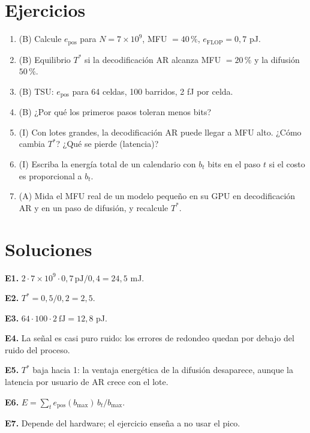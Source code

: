 \documentclass[11pt,a4paper]{article}
\begin{document}
\section{Ejercicios}
\begin{enumerate}[label=\textbf{E\arabic*.}]
\item (B) Calcule $e_{\text{pos}}$ para $N=7\times10^9$, MFU $=40\,\%$, $e_{\text{FLOP}}=0{,}7$ pJ.
\item (B) Equilibrio $T^\ast$ si la decodificación AR alcanza MFU $=20\,\%$ y la difusión $50\,\%$.
\item (B) TSU: $e_{\text{pos}}$ para 64 celdas, 100 barridos, 2 fJ por celda.
\item (B) ¿Por qué los primeros pasos toleran menos bits?
\item (I) Con lotes grandes, la decodificación AR puede llegar a MFU alto. ¿Cómo cambia $T^\ast$? ¿Qué se pierde (latencia)?
\item (I) Escriba la energía total de un calendario con $b_t$ bits en el paso $t$ si el costo es proporcional a $b_t$.
\item (A) Mida el MFU real de un modelo pequeño en su GPU en decodificación AR y en un paso de difusión, y recalcule $T^\ast$.
\end{enumerate}
\section{Soluciones}
\begin{solucion}
\textbf{E1.} $2\cdot7\times10^9\cdot0{,}7\,\text{pJ}/0{,}4=24{,}5$ mJ.

\textbf{E2.} $T^\ast=0{,}5/0{,}2=2{,}5$.

\textbf{E3.} $64\cdot100\cdot2\ \text{fJ}=12{,}8$ pJ.

\textbf{E4.} La señal es casi puro ruido: los errores de redondeo quedan por debajo del ruido del proceso.

\textbf{E5.} $T^\ast$ baja hacia 1: la ventaja energética de la difusión desaparece, aunque la latencia por usuario de AR crece con el lote.

\textbf{E6.} $E=\sum_te_{\text{pos}}(b_{\max})\,b_t/b_{\max}$.

\textbf{E7.} Depende del hardware; el ejercicio enseña a no usar el pico.
\end{solucion}
\end{document}
